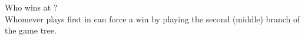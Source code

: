 \documentclass[11pt, reqno]{amsart}
\begin{document}
\begin{problem}[4]
\begin{enumalph}
    \item Who wins at \cram? \\
      Whomever plays first in \cram can force a win
      by playing the second (middle) branch of the game tree.
  \end{enumalph}
\end{problem}
\end{document}
